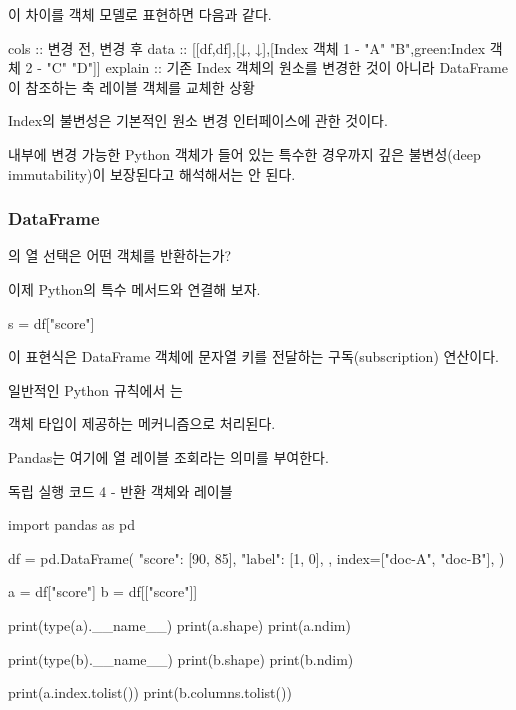 이 차이를 객체 모델로 표현하면 다음과 같다.

\begin{dhkmatrix}[delim=none,style=cards]
cols :: 변경 전, 변경 후
data :: [[df,df],[↓, ↓],[Index 객체 1 - "A" "B",green:Index 객체 2 - "C" "D"]]
explain :: 기존 Index 객체의 원소를 변경한 것이 아니라 DataFrame이 참조하는 축 레이블 객체를 교체한 상황
\end{dhkmatrix}

Index의 불변성은 기본적인 원소 변경 인터페이스에 관한 것이다.

내부에 변경 가능한 Python 객체가 들어 있는 특수한 경우까지 깊은 불변성(deep immutability)이 보장된다고 해석해서는 안 된다.

\subsubsection{DataFrame}의 열 선택은 어떤 객체를 반환하는가?

이제 Python의 특수 메서드와 연결해 보자.

\begin{dhkcode}
s = df["score"]
\end{dhkcode}

이 표현식은 DataFrame 객체에 문자열 키를 전달하는 구독(subscription) 연산이다.

일반적인 Python 규칙에서 는 

객체 타입이 제공하는  메커니즘으로 처리된다.

Pandas는 여기에 열 레이블 조회라는 의미를 부여한다.

\begin{dhknote}
\begin{dhksmry}[centered]
독립 실행 코드 4 - 반환 객체와 레이블
\end{dhksmry}
\end{dhknote}

\begin{dhkcode}
import pandas as pd

df = pd.DataFrame(
    {
        "score": [90, 85],
        "label": [1, 0],
    },
    index=["doc-A", "doc-B"],
)

a = df["score"]
b = df[["score"]]

print(type(a).__name__)
print(a.shape)
print(a.ndim)

print(type(b).__name__)
print(b.shape)
print(b.ndim)

print(a.index.tolist())
print(b.columns.tolist())
\end{dhkcode}

